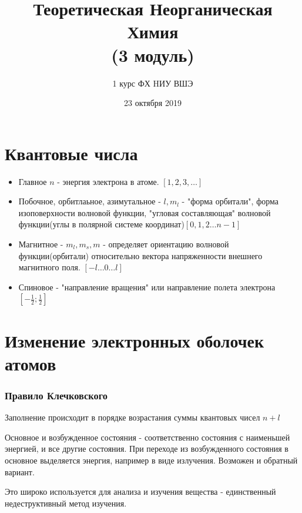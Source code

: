 \documentclass[11pt]{article}
\title{\textbf{Теоретическая Неорганическая Химия}\\ {\normalsize (3 модуль)}}
\author{1 курс ФХ HИУ ВШЭ}
\date{23 октября 2019}
\begin{document}
\begin{titlepage}
\maketitle
\end{titlepage}
\tableofcontents

\section*{Квантовые числа} 
\begin{itemize}
\item Главное $n$ - энергия электрона в атоме. $[1,2,3,\ldots]$

\item Побочное, орбитлаьное, азимутальное - $l, m_l$ - "форма орбитали", форма изоповерхности волновой функции, "угловая составляющая" волновой функции(углы в полярной системе координат)$[0,1,2\ldots n-1]$

\item Магнитное - $m_l, m_s, m$ - определяет ориентацию волновой функции(орбитали) относительно вектора напряженности внешнего магнитного поля. $[-l \ldots 0\ldots l]$

\item Спиновое - "направление вращения" или направление полета электрона$[-\frac 12;\frac 12]$

\end{itemize}


\section*{Изменение электронных оболочек атомов}




\subsubsection*{Правило Клечковского}

Заполнение происходит в порядке возрастания суммы квантовых чисел $n+l$

Основное и возбужденное состояния - соответственно состояния с наименьшей энергией, и все другие состояния. При переходе из возбужденного состояния в основное выделяется энергия, например в виде излучения. Возможен и обратный вариант.

Это широко используется для анализа и изучения вещества - единственный недеструктивный метод изучения.
\end{document}
